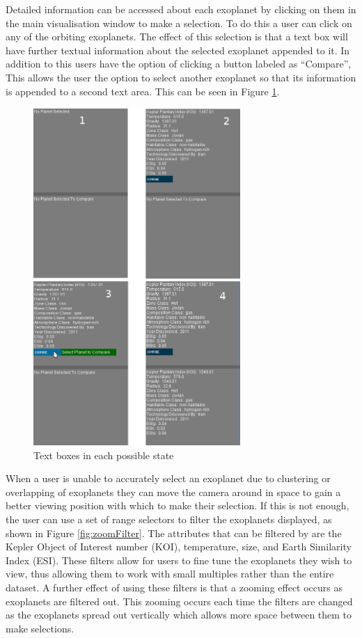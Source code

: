 Detailed information can be accessed about each exoplanet by clicking on them in
the main visualisation window to
make a selection. To do this a user can click on any of the orbiting exoplanets.
The effect of this selection is that a text box will have further textual
information about the selected exoplanet appended to it. In addition to this
users have the option of clicking a button labeled  as ``Compare'', This allows
the user the option to select another exoplanet so that its information is
appended to a second text area. This can be seen in Figure \ref{fig:textBoxes}. 
\begin{figure}[H]
  \centering
      \includegraphics[width=0.7\textwidth]{images/textBoxes.jpg}
  \caption{Text boxes in each possible state}
  \label{fig:textBoxes}
\end{figure}
When a user is unable to accurately select an
exoplanet due to clustering or
overlapping of exoplanets they can move the camera around in space to gain a
better viewing position with which to make their selection. If this is not
enough, the user can use a set of range selectors to filter the exoplanets
displayed, as shown in Figure \ref{fig:zoomFilter}. The attributes that can be
filtered by are the Kepler Object of Interest number (KOI),
temperature, size, and Earth Similarity Index (ESI). These filters allow for
users to fine tune the exoplanets they wish to view, thus allowing them to work
with small multiples rather than the entire dataset. A further effect of using
these filters is that a zooming effect occurs as exoplanets are filtered out.
This zooming occurs each time the filters are changed as the exoplanets spread
out vertically which allows more space between them to make selections.

